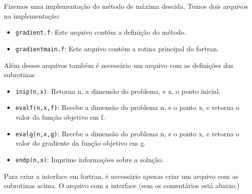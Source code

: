 \documentclass[letterpaper,11pt]{article}
\numberwithin{equation}{section}
\begin{document}
Fizemos uma implementação do método de máxima descida. Temos dois arquivos na implementação:
\begin{itemize}
 \item \verb+gradient.f+: Este arquivo contém a definição do método.
 \item \verb+gradientmain.f+: Este arquivo contém a rotina principal do fortran.
\end{itemize}
Além desses arquivos também é necessário um arquivo com as definições das subrotinas
\begin{itemize}
 \item \verb+inip(n,x)+: Retorna n, a dimensão do problema, e x, o ponto inicial.
 \item \verb+evalf(n,x,f)+: Recebe a dimensão do problema n, e o ponto x, e retorna o
valor da função objetivo em f.
 \item \verb+evalg(n,x,g)+: Recebe a dimensão do problema n, e o ponto x, e retorna o
valor do gradiente da função objetivo em g.
 \item \verb+endp(n,x)+: Imprime informações sobre a solução.
\end{itemize}
Para criar a interface em fortran, é necessário apenas criar um arquivo com as subrotinas
acima.
O arquivo com a interface (sem os comentários está abaixo:)
\end{document}
